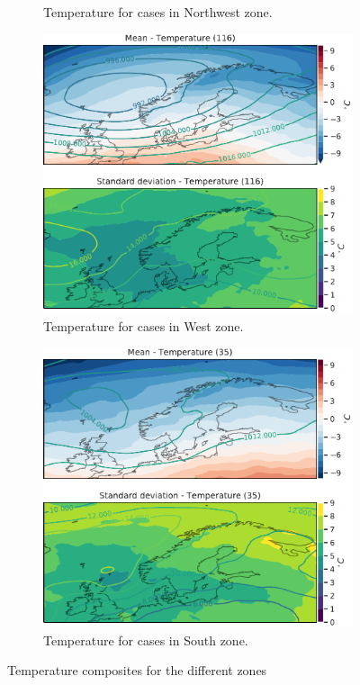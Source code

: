 \begin{figure}
\begin{subfigure}[b]{0.49\textwidth}
    \caption{Temperature for cases in Northwest zone.}
    \label{fig:NordWestTemperature}
\end{subfigure}
\begin{subfigure}[b]{0.49\textwidth}
    \centering
    \includegraphics[width=\textwidth]{Figures/TempVest.pdf}
    \caption{Temperature for cases in West zone.}
    \label{fig:WestTemperature}
\end{subfigure}
\begin{subfigure}[b]{0.49\textwidth}
    \centering
    \includegraphics[width=\textwidth]{Figures/TempSor.pdf}
    \caption{Temperature for cases in South zone.}
    \label{fig:SouthTemperature}
\end{subfigure}
\caption{Temperature composites for the different zones}
\label{fig:tempzones}
\end{figure}

